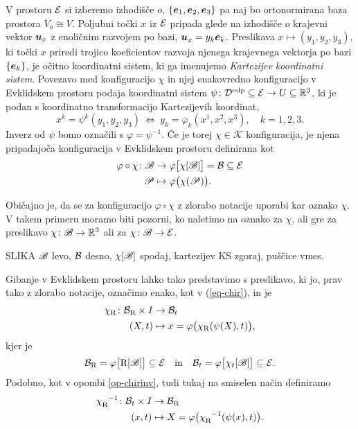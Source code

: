 V prostoru $\mathcal E$ si izberemo izhodišče $o$, $\{\boldsymbol e_1,\boldsymbol e_2,\boldsymbol e_3\}$ pa naj bo ortonormirana
baza prostora $V_o\cong V$. Poljubni točki $x$ iz $\mathcal E$ pripada glede na izhodišče $o$ krajevni
vektor $\boldsymbol u_x$ z enoličnim
razvojem po bazi, $\boldsymbol u_x=y_k\boldsymbol e_k$. Preslikava $x\mapsto (y_1,y_2,y_3)$, ki točki $x$ priredi
trojico koeficientov razvoja njenega krajevnega vektorja po bazi $\{\boldsymbol e_k\}$, je očitno koordinatni sistem,
ki ga imenujemo \emph{Kartezijev koordinatni sistem}. 
Povezavo med konfiguracijo $\chi$ in njej enakovredno konfiguracijo v Evklidskem prostoru
podaja koordinatni sistem $\psi \colon\mathcal{D}^{\mathrm{odp}}\subseteq\mathcal E\rightarrow U\subseteq\mathbb R^3$,\label{ks}
ki je podan s koordinatno transformacijo Kartezijevih koordinat,
\begin{equation*}
	x^k = \psi^k(y_1,y_2,y_3) \ \Leftrightarrow \ y_k=\varphi_k(x^1,x^2,x^3), \quad k=1,2,3.
\end{equation*}
Inverz od $\psi$ bomo označili s $\varphi=\psi^{-1}$. Če je torej $\chi\in\mathscr{K}$ konfiguracija,
je njena pripadajoča konfiguracija v Evklidskem prostoru definirana kot
\begin{align*}
	\varphi\circ\chi\colon\mathscr B&\rightarrow\varphi\big[\chi[\mathscr B]\big]=\mathcal B\subseteq\mathcal E\\
	\mathscr P&\mapsto\varphi\big(\chi(\mathscr P)\big).
\end{align*}
\begin{opomba}
Običajno je, da se za konfiguracijo $\varphi\circ\chi$ z zlorabo notacije uporabi kar oznako $\chi$. V takem primeru
moramo biti pozorni, ko naletimo na oznako za $\chi$, ali gre za preslikavo 
$\chi\colon\mathscr B\rightarrow\mathbb R^3$ ali za $\chi\colon\mathscr B\rightarrow\mathcal E$.
\end{opomba}
{\color[rgb]{1,0,0}SLIKA $\mathscr B$ levo, $\mathcal B$ desno, $\chi[\mathscr B]$ spodaj, kartezijev KS zgoraj, puščice vmes.}

Gibanje v Evklidskem prostoru lahko tako predstavimo s preslikavo, ki jo, prav tako z zlorabo notacije,
označimo enako, kot v (\ref{eq-chir}), in je
\begin{align}
	\chi_{\mathrm R} \colon\mathcal B_{\mathrm R}\times I&\rightarrow \mathcal B_{t} \nonumber \\
	(X,t) &\mapsto x=\varphi\big(\chi_{\mathrm R}(\psi(X),t)\big), \label{eq-chire}
\end{align}
kjer je
\begin{equation*}
	\mathcal B_{\mathrm R}=\varphi\big[\mathrm R[\mathscr B]\big]\subseteq\mathcal E \quad\mathrm{in}\quad \mathcal B_{t}=\varphi\big[\chi_t[\mathscr B]\big]\subseteq\mathcal E.
\end{equation*}
Podobno, kot v opombi \ref{op-chirinv}, tudi tukaj na smiselen način definiramo
\begin{align}
	\bottop{\chi}{\r}{-1} \colon\body_{t}\times I&\rightarrow \body_{\r} \nonumber \\
	(x,t) &\mapsto X=\varphi\big(\bottop{\chi}{\r}{-1}(\psi(x),t)\big). \label{eq-chirinve}
\end{align}


